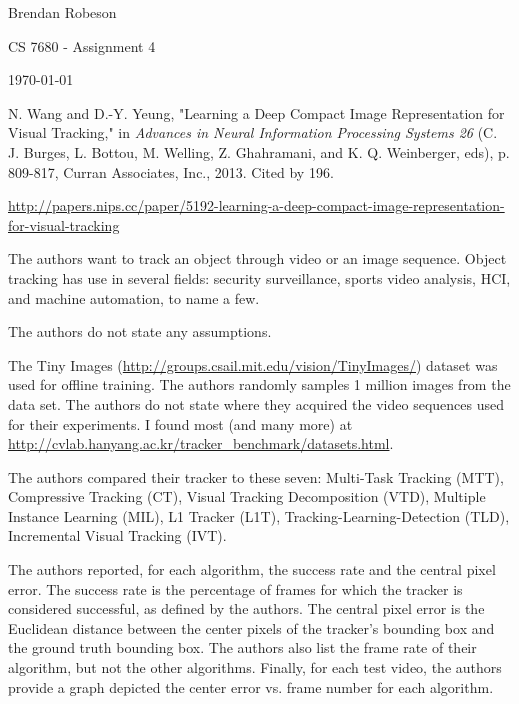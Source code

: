 \documentclass[11pt]{article}
\begin{document}
\noindent Brendan Robeson

\noindent CS 7680 - Assignment 4

\noindent \today

\medskip

\begin{description}[leftmargin=0in]
    \item [Source] N. Wang and D.-Y. Yeung, "Learning a Deep Compact Image
        Representation for Visual Tracking," in \emph{Advances in Neural
        Information Processing Systems 26} (C. J. Burges, L. Bottou, M. Welling,
        Z. Ghahramani, and K. Q. Weinberger, eds), p. 809-817, Curran
        Associates, Inc., 2013. Cited by 196.

    \item [URL]
        {\smaller\url{http://papers.nips.cc/paper/5192-learning-a-deep-compact-image-representation-for-visual-tracking}}

    \item [Problem] The authors want to track an object through video or an
        image sequence. Object tracking has use in several fields: security
        surveillance, sports video analysis, HCI, and machine automation, to
        name a few.

    \item [Assumptions] The authors do not state any assumptions.

    \item [Data Sets] The Tiny Images
        (\url{http://groups.csail.mit.edu/vision/TinyImages/}) dataset was used for
        offline training. The authors randomly samples 1 million images from the
        data set. The authors do not state where they acquired the video
        sequences used for their experiments. I found most (and many more) at
        \url{http://cvlab.hanyang.ac.kr/tracker_benchmark/datasets.html}.

    \item [Algorithm Overview]

    \item [Experiments] The authors compared their tracker to these seven:
        Multi-Task Tracking (MTT), Compressive Tracking (CT), Visual Tracking
        Decomposition (VTD), Multiple Instance Learning (MIL), L1 Tracker (L1T),
        Tracking-Learning-Detection (TLD), Incremental Visual Tracking (IVT).

        The authors reported, for each algorithm, the success rate and the
        central pixel error. The success rate is the percentage of frames for
        which the tracker is considered successful, as defined by the authors.
        The central pixel error is the Euclidean distance between the center
        pixels of the tracker's bounding box and the ground truth bounding box.
        The authors also list the frame rate of their algorithm, but not the
        other algorithms. Finally, for each test video, the authors provide a
        graph depicted the center error vs. frame number for each algorithm.


\end{description}
\end{document}

